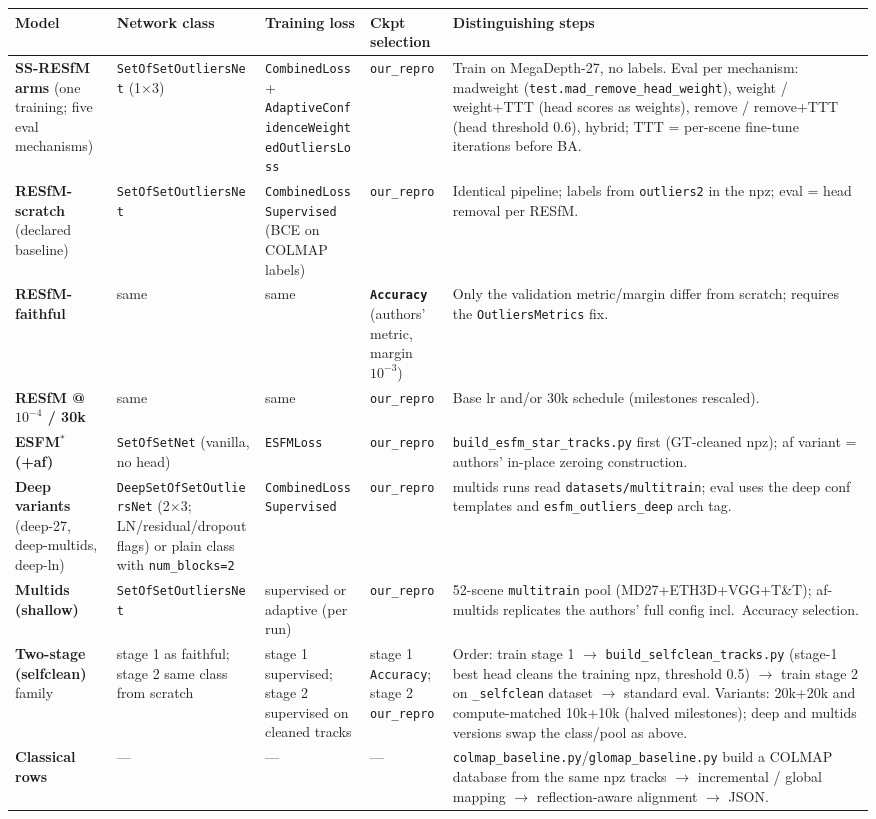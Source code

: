 \documentclass[10pt]{article}
\newcommand{\code}[1]{\texttt{\small #1}}
\begin{document}
\begingroup\small
\setlength{\tabcolsep}{4pt}
\begin{longtable}{p{3.6cm}p{2.6cm}p{2.6cm}p{2.9cm}p{4.2cm}}
\toprule
Model & Network class & Training loss & Ckpt selection & Distinguishing steps\\
\midrule
\textbf{SS-RESfM arms} (one training; five eval mechanisms) & \code{SetOfSetOutliersNet} (1$\times$3) & \code{CombinedLoss} + \code{AdaptiveConfidence\-WeightedOutliersLoss} & \code{our\_repro} & Train on MegaDepth-27, no labels. Eval per mechanism: madweight (\code{test.mad\_remove\_head\_weight}), weight / weight+TTT (head scores as weights), remove / remove+TTT (head threshold 0.6), hybrid; TTT = per-scene fine-tune iterations before BA.\\
\textbf{RESfM-scratch} (declared baseline) & \code{SetOfSetOutliersNet} & \code{CombinedLoss\-Supervised} (BCE on COLMAP labels) & \code{our\_repro} & Identical pipeline; labels from \code{outliers2} in the npz; eval = head removal per RESfM.\\
\textbf{RESfM-faithful} & same & same & \textbf{\code{Accuracy}} (authors' metric, margin $10^{-3}$) & Only the validation metric/margin differ from scratch; requires the \code{OutliersMetrics} fix.\\
\textbf{RESfM @$10^{-4}$ / 30k} & same & same & \code{our\_repro} & Base lr and/or 30k schedule (milestones rescaled).\\
\textbf{ESFM$^{\ast}$ (+af)} & \code{SetOfSetNet} (vanilla, no head) & \code{ESFMLoss} & \code{our\_repro} & \code{build\_esfm\_star\_tracks.py} first (GT-cleaned npz); af variant = authors' in-place zeroing construction.\\
\textbf{Deep variants} (deep-27, deep-multids, deep-ln) & \code{DeepSetOfSetOutliersNet} (2$\times$3; LN/residual/dropout flags) or plain class with \code{num\_blocks=2} & \code{CombinedLoss\-Supervised} & \code{our\_repro} & multids runs read \code{datasets/multitrain}; eval uses the deep conf templates and \code{esfm\_outliers\_deep} arch tag.\\
\textbf{Multids (shallow)} & \code{SetOfSetOutliersNet} & supervised or adaptive (per run) & \code{our\_repro} & 52-scene \code{multitrain} pool (MD27+ETH3D+VGG+T\&T); af-multids replicates the authors' full config incl.\ Accuracy selection.\\
\textbf{Two-stage (selfclean)} family & stage 1 as faithful; stage 2 same class from scratch & stage 1 supervised; stage 2 supervised on cleaned tracks & stage 1 \code{Accuracy}; stage 2 \code{our\_repro} & Order: train stage 1 $\to$ \code{build\_selfclean\_tracks.py} (stage-1 best head cleans the training npz, threshold 0.5) $\to$ train stage 2 on \code{*\_selfclean} dataset $\to$ standard eval. Variants: 20k+20k and compute-matched 10k+10k (halved milestones); deep and multids versions swap the class/pool as above.\\
\textbf{Classical rows} & --- & --- & --- & \code{colmap\_baseline.py}/\code{glomap\_baseline.py} build a COLMAP database from the same npz tracks $\to$ incremental / global mapping $\to$ reflection-aware alignment $\to$ JSON.\\
\bottomrule
\end{longtable}
\endgroup
\end{document}
